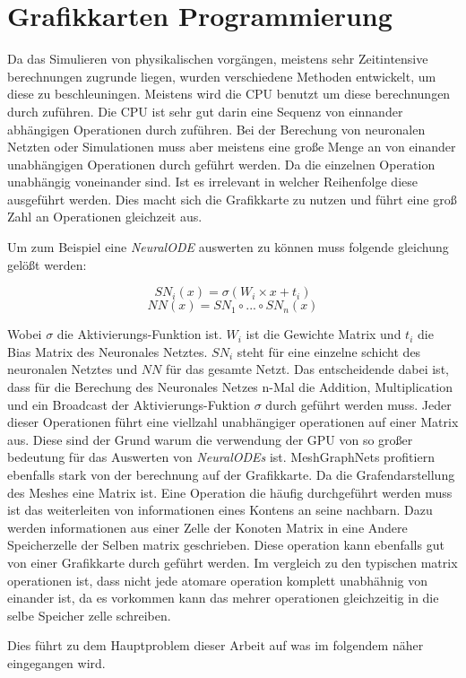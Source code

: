 
\section{Grafikkarten Programmierung} \label{sec:gpu}

Da das Simulieren von physikalischen vorgängen, 
meistens sehr Zeitintensive berechnungen zugrunde liegen, 
wurden verschiedene Methoden entwickelt, 
um diese zu beschleuningen.
Meistens wird die CPU benutzt um diese berechnungen durch zuführen.
Die CPU ist sehr gut darin eine Sequenz von einnander abhängigen Operationen durch zuführen.
Bei der Berechung von neuronalen Netzten oder Simulationen muss aber meistens eine große Menge 
an von einander unabhängigen Operationen durch geführt werden.
Da die einzelnen Operation unabhängig voneinander sind.
Ist es irrelevant in welcher Reihenfolge diese ausgeführt werden.
Dies macht sich die Grafikkarte zu nutzen und führt eine groß Zahl an Operationen gleichzeit aus.

Um zum Beispiel eine \textit{NeuralODE} auswerten zu können muss folgende gleichung gelößt werden:

$$
SN_i(x) = \sigma ( W_i \times x + t_i )
$$
$$
NN(x) = SN_1 \circ ... \circ SN_n (x)
$$

Wobei $\sigma$ die Aktivierungs-Funktion ist. $W_i$ ist die Gewichte Matrix und $t_i$ die Bias Matrix des Neuronales Netztes.
$SN_i$ steht für eine einzelne schicht des neuronalen Netztes und $NN$ für das gesamte Netzt.
Das entscheidende dabei ist, dass für die Berechung des Neuronales Netzes n-Mal die Addition, Multiplication und ein Broadcast der Aktivierungs-Fuktion
$\sigma$ durch geführt werden muss.
Jeder dieser Operationen führt eine viellzahl unabhängiger operationen auf einer Matrix aus.
Diese sind der Grund warum die verwendung der GPU von so großer bedeutung für das Auswerten von \textit{NeuralODEs} ist.
MeshGraphNets profitiern ebenfalls stark von der berechnung auf der Grafikkarte.
Da die Grafendarstellung des Meshes eine Matrix ist.
Eine Operation die häufig durchgeführt werden muss ist das weiterleiten von informationen eines Kontens an seine nachbarn.
Dazu werden informationen aus einer Zelle der Konoten Matrix in eine Andere Speicherzelle der Selben matrix geschrieben.
Diese operation kann ebenfalls gut von einer Grafikkarte durch geführt werden.
Im vergleich zu den typischen matrix operationen ist, dass nicht jede atomare operation komplett unabhähnig von einander ist,
da es vorkommen kann das mehrer operationen gleichzeitig in die selbe Speicher zelle schreiben.

Dies führt zu dem Hauptproblem dieser Arbeit auf was im folgendem näher eingegangen wird.










% 